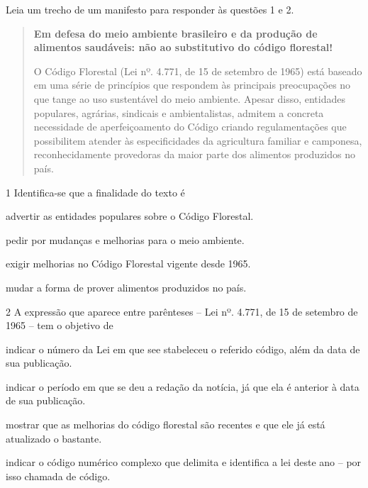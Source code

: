 
Leia um trecho de um manifesto para responder às questões 1 e 2.

\begin{quote}
\textbf{Em defesa do meio ambiente brasileiro e da produção de alimentos
saudáveis: não ao substitutivo do código florestal!}


O Código Florestal (Lei nº. 4.771, de 15 de setembro de 1965) está
baseado em uma série de princípios que respondem às principais
preocupações no que tange ao uso sustentável do meio ambiente. Apesar
disso, entidades populares, agrárias, sindicais e ambientalistas,
admitem a concreta necessidade de aperfeiçoamento do Código criando
regulamentações que possibilitem atender às especificidades da
agricultura familiar e camponesa, reconhecidamente provedoras da maior
parte dos alimentos produzidos no país.

\end{quote}

\num{1} Identifica-se que a finalidade do texto é

\begin{escolha}
\item advertir as entidades populares sobre o Código Florestal.

\item pedir por mudanças e melhorias para o meio ambiente.

\item exigir melhorias no Código Florestal vigente desde 1965.

\item mudar a forma de prover alimentos produzidos no país.
\end{escolha}

\num{2} A expressão que aparece entre parênteses -- Lei nº. 4.771, de 15
de setembro de 1965 -- tem o objetivo de

\begin{escolha}
\item indicar o número da Lei em que see stabeleceu o referido código,
além da data de sua publicação.

\item indicar o período em que se deu a redação da notícia, já que ela é
anterior à data de sua publicação.

\item mostrar que as melhorias do código florestal são recentes e que ele
já está atualizado o bastante.

\item indicar o código numérico complexo que delimita e identifica a lei
deste ano -- por isso chamada de código.
\end{escolha}


